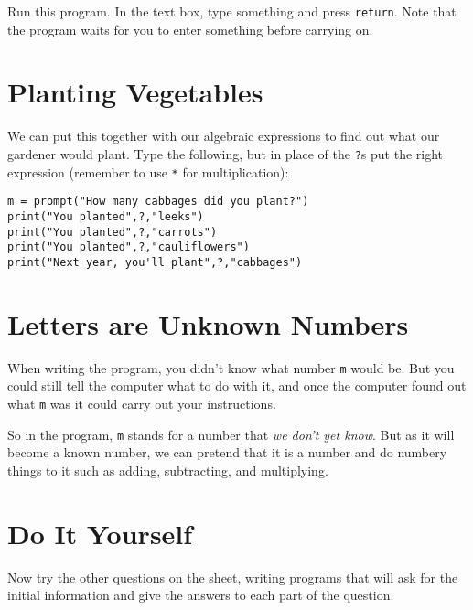 \documentclass[
  xhtml,%
  use filename%
]{internet}
\begin{document}
Run this program.
In the text box, type something and press \verb+return+.
Note that the program waits for you to enter something before carrying on.

\section*{Planting Vegetables}

We can put this together with our algebraic expressions to find out what our gardener would plant.
Type the following, but in place of the \verb+?+s put the right expression (remember to use \verb+*+ for multiplication):

\begin{verbatim}
m = prompt("How many cabbages did you plant?")
print("You planted",?,"leeks")
print("You planted",?,"carrots")
print("You planted",?,"cauliflowers")
print("Next year, you'll plant",?,"cabbages")
\end{verbatim}

\section*{Letters are Unknown Numbers}

When writing the program, you didn't know what number \verb+m+ would be.
But you could still tell the computer what to do with it, and once the computer found out what \verb+m+ was it could carry out your instructions.

So in the program, \verb+m+ stands for a number that \emph{we don't yet know}.
But as it will become a known number, we can pretend that it is a number and do numbery things to it such as adding, subtracting, and multiplying.

\section*{Do It Yourself}

Now try the other questions on the sheet, writing programs that will ask for the initial information and give the answers to each part of the question.
\end{document}
